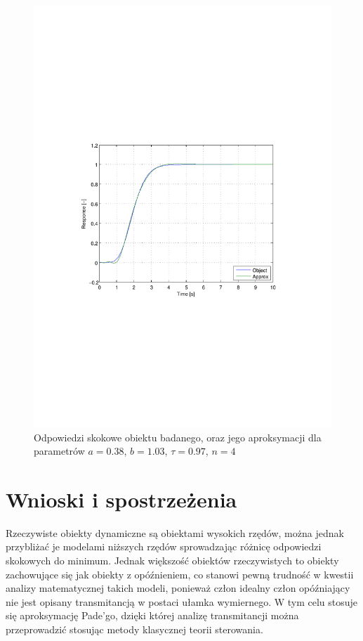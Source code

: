\documentclass[12pt]{article}
\begin{document}
\begin{figure}[!htb]
	\begin{center}
		\includegraphics[width=14cm,trim=3cm 9cm 3cm 9cm,clip]
		{../res/img/modelfit_a.pdf} 
	\end{center}
	\caption{Odpowiedzi skokowe obiektu badanego, oraz jego aproksymacji dla
	parametrów $a=0.38$, $b=1.03$, $\tau=0.97$, $n=4$}
\end{figure}

\section{Wnioski i spostrzeżenia}

Rzeczywiste obiekty dynamiczne są obiektami wysokich rzędów, można jednak
przybliżać je modelami niższych rzędów sprowadzając różnicę odpowiedzi skokowych
do minimum. Jednak większość obiektów rzeczywistych to obiekty zachowujące się
jak obiekty z opóźnieniem, co stanowi pewną trudność w kwestii analizy
matematycznej takich modeli, ponieważ człon idealny człon opóźniający nie jest
opisany transmitancją w postaci ułamka wymiernego. W tym celu stosuje się
aproksymację Pade'go, dzięki której analizę transmitancji można przeprowadzić
stosując metody klasycznej teorii sterowania.
\end{document}
